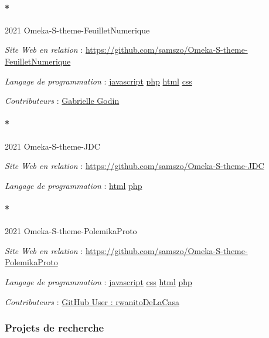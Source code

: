 \documentclass[
  a4paper,
  DIV=11,
  numbers=noendperiod]{scrreprt}
\let\oldparagraph\paragraph
\renewcommand{\paragraph}[1]{\oldparagraph{#1}\mbox{}}
\begin{document}
\paragraph*{2021
Omeka-S-theme-FeuilletNumerique}\label{omeka-s-theme-feuilletnumerique}

\emph{Site Web en relation} :
\url{https://github.com/samszo/Omeka-S-theme-FeuilletNumerique}

\emph{Langage de programmation} :
\href{http://localhost/samszo/omk/s/fiches/item/89711}{javascript}
\href{http://localhost/samszo/omk/s/fiches/item/108369}{php}
\href{http://localhost/samszo/omk/s/fiches/item/96621}{html}
\href{http://localhost/samszo/omk/s/fiches/item/102418}{css}

\emph{Contributeurs} :
\href{http://localhost/samszo/omk/s/fiches/item/62567}{Gabrielle Godin}

\paragraph*{2021 Omeka-S-theme-JDC}\label{sec-item301853}

\emph{Site Web en relation} :
\url{https://github.com/samszo/Omeka-S-theme-JDC}

\emph{Langage de programmation} :
\href{http://localhost/samszo/omk/s/fiches/item/96621}{html}
\href{http://localhost/samszo/omk/s/fiches/item/108369}{php}

\paragraph*{2021 Omeka-S-theme-PolemikaProto}\label{sec-item301858}

\emph{Site Web en relation} :
\url{https://github.com/samszo/Omeka-S-theme-PolemikaProto}

\emph{Langage de programmation} :
\href{http://localhost/samszo/omk/s/fiches/item/89711}{javascript}
\href{http://localhost/samszo/omk/s/fiches/item/102418}{css}
\href{http://localhost/samszo/omk/s/fiches/item/96621}{html}
\href{http://localhost/samszo/omk/s/fiches/item/108369}{php}

\emph{Contributeurs} :
\href{http://localhost/samszo/omk/s/fiches/item/301461}{GitHub User :
rwanitoDeLaCasa}

\subsubsection{Projets de recherche}\label{sec-item301731}
\end{document}
